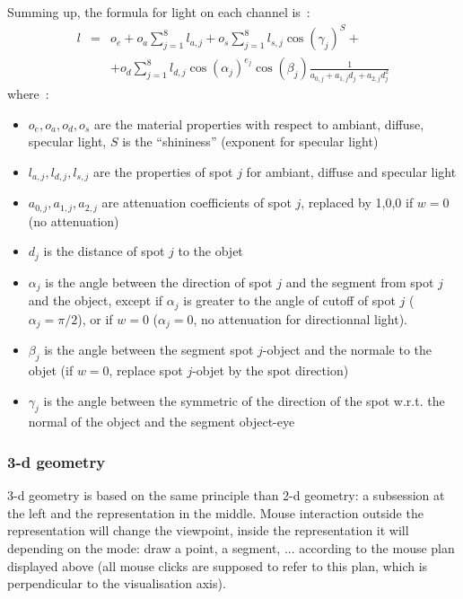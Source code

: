 \documentclass{article}
\begin{document}
Summing up, the formula for light on each channel is~:
\begin{eqnarray*}
 l &=&o_e+ o_a \sum_{j=1}^8 l_{a,j} + o_s \sum_{j=1}^8 l_{s,j}
 \cos(\gamma_j)^S + \\
 &  & +  o_d \sum_{j=1}^8 l_{d,j} 
\cos(\alpha_j)^{e_j} \cos(\beta_j) \frac{1}{a_{0,j}+a_{1,j}
  d_j+a_{2,j} d_j^2} 
\end{eqnarray*}
where~:
\begin{itemize}
\item $o_e,o_a,o_d,o_s$ are the material properties with respect to
 ambiant, diffuse, specular light, $S$ is the
``shininess'' (exponent for specular light)
\item $l_{a,j},l_{d,j},l_{s,j}$ are the properties of spot $j$ for
  ambiant, diffuse and specular light
\item $a_{0,j}, a_{1,j}, a_{2,j}$ are attenuation coefficients
of spot $j$, replaced by 1,0,0 if $w=0$ (no attenuation)
\item $d_j$ is the distance of spot $j$ to the objet
\item $\alpha_j$ is the angle between the direction of spot $j$ and the
segment from spot $j$ and the object, except if $\alpha_j$ is
greater to the angle of cutoff of spot $j$ ($\alpha_j=\pi/2$), 
or if $w=0$ ($\alpha_j=0$, no attenuation for directionnal light).
\item $\beta_j$ is the angle between the segment spot $j$-object and
the normale to the objet (if $w=0$, replace spot $j$-objet by
the spot direction)
\item $\gamma_j$ is the angle between the symmetric of the direction 
of the spot w.r.t. the normal of the object 
and the segment object-eye
\end{itemize}


\subsubsection{3-d geometry}
3-d geometry is based on the same principle than 2-d geometry: a
subsession at the left and the representation in the
middle. Mouse interaction outside the representation will
change the viewpoint, inside the representation it will depending
on the mode: draw a point, a segment, ... according to the mouse
plan displayed above (all mouse clicks are supposed to refer
to this plan, which is perpendicular to the visualisation axis).
\end{document}
